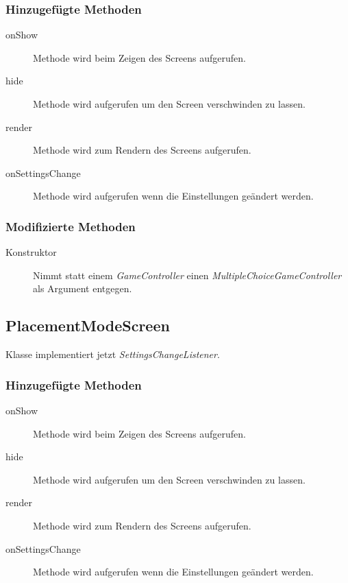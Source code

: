 \subsubsection{Hinzugefügte Methoden}
\begin{description}

\item[onShow]
Methode wird beim Zeigen des Screens aufgerufen.

\item[hide]
Methode wird aufgerufen um den Screen verschwinden zu lassen.

\item[render]
Methode wird zum Rendern des Screens aufgerufen.

\item[onSettingsChange]
Methode wird aufgerufen wenn die Einstellungen geändert werden.

\end{description}

\subsubsection{Modifizierte Methoden}
\begin{description}
\item[Konstruktor]
Nimmt statt einem \emph{GameController} einen \emph{MultipleChoiceGameController} als Argument entgegen.

\end{description}

\subsection{PlacementModeScreen}
Klasse implementiert jetzt \emph{SettingsChangeListener}.

\subsubsection{Hinzugefügte Methoden}
\begin{description}

\item[onShow]
Methode wird beim Zeigen des Screens aufgerufen.

\item[hide]
Methode wird aufgerufen um den Screen verschwinden zu lassen.

\item[render]
Methode wird zum Rendern des Screens aufgerufen.

\item[onSettingsChange]
Methode wird aufgerufen wenn die Einstellungen geändert werden.
\end{description}

